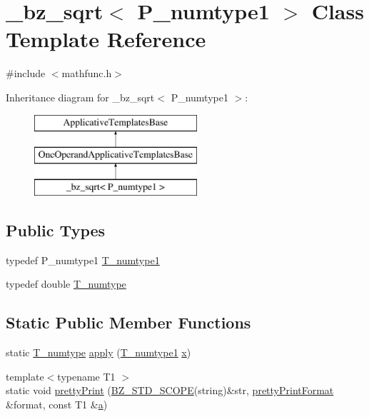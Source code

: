 \hypertarget{class__bz__sqrt}{}\section{\+\_\+bz\+\_\+sqrt$<$ P\+\_\+numtype1 $>$ Class Template Reference}
\label{class__bz__sqrt}


{\ttfamily \#include $<$mathfunc.\+h$>$}

Inheritance diagram for \+\_\+bz\+\_\+sqrt$<$ P\+\_\+numtype1 $>$\+:\begin{figure}[H]
\begin{center}
\leavevmode
\includegraphics[height=3.000000cm]{class__bz__sqrt}
\end{center}
\end{figure}
\subsection*{Public Types}
\begin{DoxyCompactItemize}
\item 
typedef P\+\_\+numtype1 \hyperlink{class__bz__sqrt_a9b47132c3de85053d524a80c8d14ea32}{T\+\_\+numtype1}
\item 
typedef double \hyperlink{class__bz__sqrt_ab0f9bb977936c05f706245fb8fc3aa12}{T\+\_\+numtype}
\end{DoxyCompactItemize}
\subsection*{Static Public Member Functions}
\begin{DoxyCompactItemize}
\item 
static \hyperlink{class__bz__sqrt_ab0f9bb977936c05f706245fb8fc3aa12}{T\+\_\+numtype} \hyperlink{class__bz__sqrt_ad5682a963b1fff2a10b703a1d296c240}{apply} (\hyperlink{class__bz__sqrt_a9b47132c3de85053d524a80c8d14ea32}{T\+\_\+numtype1} \hyperlink{vecnorm1_8cc_ac73eed9e41ec09d58f112f06c2d6cb63}{x})
\item 
{\footnotesize template$<$typename T1 $>$ }\\static void \hyperlink{class__bz__sqrt_a0ba929d777912f000a7a206ef2073ee7}{pretty\+Print} (\hyperlink{numinquire_8h_a2b24ffc3b4ef9803956bc7715c6c7b83}{B\+Z\+\_\+\+S\+T\+D\+\_\+\+S\+C\+O\+P\+E}(string)\&str, \hyperlink{classprettyPrintFormat}{pretty\+Print\+Format} \&format, const T1 \&\hyperlink{gen__mat5files_8m_aae328bf20413f220e38aec4d95bfd6da}{a})
\end{DoxyCompactItemize}


